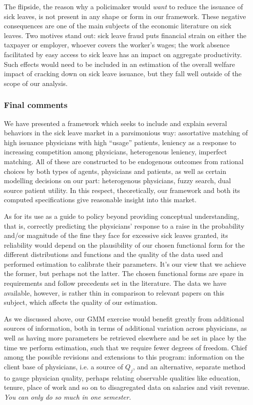 \documentclass[../main.tex]{subfiles}
\begin{document}
The flipside, the reason why a policimaker would \textit{want} to reduce the issuance of sick leaves, is not present in any shape or form in our framework. These negative consequences are one of the main subjects of the economic literature on sick leaves. Two motives stand out: sick leave fraud puts financial strain on either the taxpayer or employer, whoever covers the worker's wages; the work absence facilitated by easy access to sick leave has an impact on aggregate productivity. Such effects would need to be included in an estimation of the overall welfare impact of cracking down on sick leave issuance, but they fall well outside of the scope of our analysis.

\subsubsection*{Final comments}

We have presented a framework which seeks to include and explain several behaviors in the sick leave market in a parsimonious way: assortative matching of high issuance physicians with high ``usage'' patients, leniency as a response to increasing competition among physicians, heterogenous leniency, imperfect matching. All of these are constructed to be endogenous outcomes from rational choices by both types of agents, physicians and patients, as well as certain modelling decisions on our part: heterogenous physicians, fuzzy search, dual source patient utility. In this respect, theoretically, our framework and both its computed specifications give reasonable insight into this market.

As for its use as a guide to policy beyond providing conceptual understanding, that is, correctly predicting the physicians' response to a raise in the probability and/or magnitude of the fine they face for excessive sick leaves granted, its reliability would depend on the plausibility of our chosen functional form for the different distributions and functions and the quality of the data used and performed estimation to calibrate their parameters. It's our view that we achieve the former, but perhaps not the latter. The chosen functional forms are spare in requirements and follow precedents set in the literature. The data we have available, however, is rather thin in comparison to relevant papers on this subject, which affects the quality of our estimation.

As we discussed above, our GMM exercise would benefit greatly from additional sources of information, both in terms of additional variation across physicians, as well as having more parameters be retrieved elsewhere and be set in place by the time we perform estimation, such that we require fewer degrees of freedom. Chief among the possible revisions and extensions to this program: information on the client base of physicians, i.e. a source of $Q_j$, and an alternative, separate method to gauge physician quality, perhaps relating observable qualities like education, tenure, place of work and so on to disagregated data on salaries and visit revenue. \textit{You can only do so much in one semester.}
\end{document}
